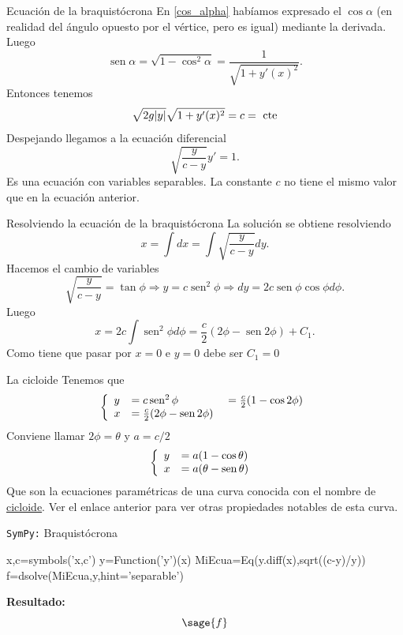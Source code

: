 \documentclass[handout,hyperref={colorlinks=true}]{beamer}
\DeclareMathOperator{\sen}{sen}
\begin{document}
\begin{frame}{Ecuación de la braquistócrona}
En \eqref{cos_alpha} habíamos expresado el $\cos\alpha$ (en realidad del ángulo opuesto por el vértice, pero es igual) mediante la derivada. Luego
\[\sen\alpha=\sqrt{1-\cos^2\alpha}=\frac{1}{\sqrt{1+y'(x)^2}}.\]
Entonces tenemos
\[\sqrt{2g|y|}\sqrt{1+y'(x)^2}=c=\hbox{ cte}\]
Despejando llegamos a la ecuación diferencial
\[\boxed{\sqrt{\frac{y}{c-y}}y'=1}.\]
Es una ecuación con variables separables. La constante $c$ no tiene el mismo valor que en la ecuación anterior.  
  \end{frame}

  \begin{frame}{Resolviendo la ecuación de la braquistócrona}
La solución se obtiene resolviendo
\[x=\int dx=\int \sqrt{\frac{y}{c-y}}dy.\]
Hacemos el cambio de variables
\[\sqrt{\frac{y}{c-y}}=\tan\phi\Longrightarrow y=c\sen^2\phi\Longrightarrow dy=2c\sen\phi\cos\phi d\phi.\]
Luego
\[x=2c\int\sen^2\phi d\phi=\frac{c}{2}\left(2\phi-\sen 2\phi\right)+C_1.\]
Como tiene que pasar por $x=0$ e $y=0$ debe ser $C_1=0$

  \end{frame}

  \begin{frame}{La cicloide}
 Tenemos que
 \[\left\{\begin{array}{l l l}
	      y&=c\sen^2 \phi&=\frac{c}{2}(1-\cos2\phi)\\
	      x&=\frac{c}{2}(2\phi-\sen2\phi)\ &\\
          \end{array}\right.
\]
Conviene llamar $2\phi=\theta$ y $a=c/2$
 \[\left\{\begin{array}{l l }
	      y&= a(1-\cos\theta)\\
	      x&=a(\theta-\sen\theta)\
          \end{array}\right.
\]
Que son la ecuaciones paramétricas de una curva conocida con el nombre de \href{http://es.wikipedia.org/wiki/Cicloide}{cicloide}. Ver el enlace anterior para ver 
otras propiedades notables de esta curva.
\begin{center}
\end{center}
  
  \end{frame}

\begin{frame}[fragile]{\texttt{SymPy:} Braquistócrona}
\begin{sageblock}
x,c=symbols('x,c')
y=Function('y')(x)
MiEcua=Eq(y.diff(x),sqrt((c-y)/y))
f=dsolve(MiEcua,y,hint='separable')
\end{sageblock}


\textbf{Resultado:}
\begingroup
\everymath{\scriptstyle}
\scriptsize
\[\sage{f}\]
\endgroup
\end{frame}
\end{document}
